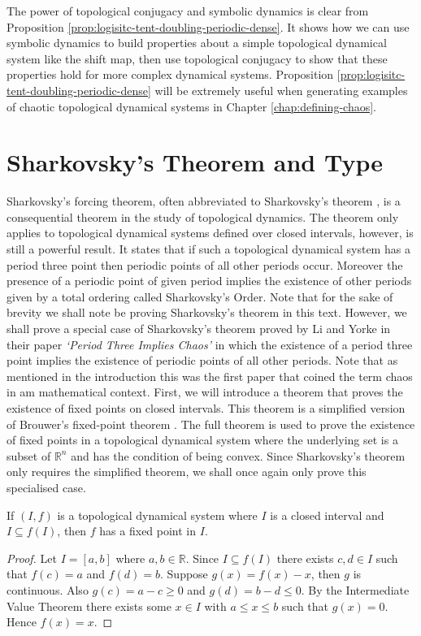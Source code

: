 The power of topological conjugacy and symbolic dynamics is clear from Proposition \ref{prop:logisitc-tent-doubling-periodic-dense}. It shows how we can use symbolic dynamics to build properties about a simple topological dynamical system like the shift map, then use topological conjugacy to show that these properties hold for more complex dynamical systems. Proposition \ref{prop:logisitc-tent-doubling-periodic-dense} will be extremely useful when generating examples of chaotic topological dynamical systems in Chapter \ref{chap:defining-chaos}.

\section{Sharkovsky's Theorem and Type}\label{sec:sharkovskys-theorem-and-type}
Sharkovsky's forcing theorem, often abbreviated to Sharkovsky's theorem \cite{sharkovsky}, is a consequential theorem in the study of topological dynamics. The theorem only applies to topological dynamical systems defined over closed intervals, however, is still a powerful result. It states that if such a topological dynamical system has a period three point then periodic points of all other periods occur. Moreover the presence of a periodic point of given period implies the existence of other periods given by a total ordering called Sharkovsky's Order. Note that for the sake of brevity we shall note be proving Sharkovsky's theorem in this text. However, we shall prove a special case of Sharkovsky's theorem proved by Li and Yorke in their paper \emph{`Period Three Implies Chaos'} \cite{li-yorke} in which the existence of a period three point implies the existence of periodic points of all other periods. Note that as mentioned in the introduction this was the first paper that coined the term chaos in am mathematical context. First, we will introduce a theorem that proves the existence of fixed points on closed intervals. This theorem is a simplified version of Brouwer's fixed-point theorem \cite{brouwer}. The full theorem is used to prove the existence of fixed points in a topological dynamical system where the underlying set is a subset of $\mathbb{R}^n$ and has the condition of being convex. Since Sharkovsky's theorem only requires the simplified theorem, we shall once again only prove this specialised case.

\begin{thm} \label{thm:interval-fixed-points}
    If $(I, f)$ is a topological dynamical system where $I$ is a closed interval and $I \subseteq f(I)$, then $f$ has a fixed point in $I$.
    \begin{proof}
        Let $I = [a, b]$ where $a, b \in \mathbb{R}$. Since $I \subseteq f(I)$ there exists $c, d \in I$ such that $f(c) = a$ and $f(d) = b$. Suppose $g(x) = f(x) - x$, then $g$ is continuous. Also $g(c) = a - c \geq 0$ and $g(d) = b - d \leq 0$. By the Intermediate Value Theorem there exists some $x \in I$ with $a \leq x \leq b$ such that $g(x) = 0$. Hence $f(x) = x$.
    \end{proof}
\end{thm}

